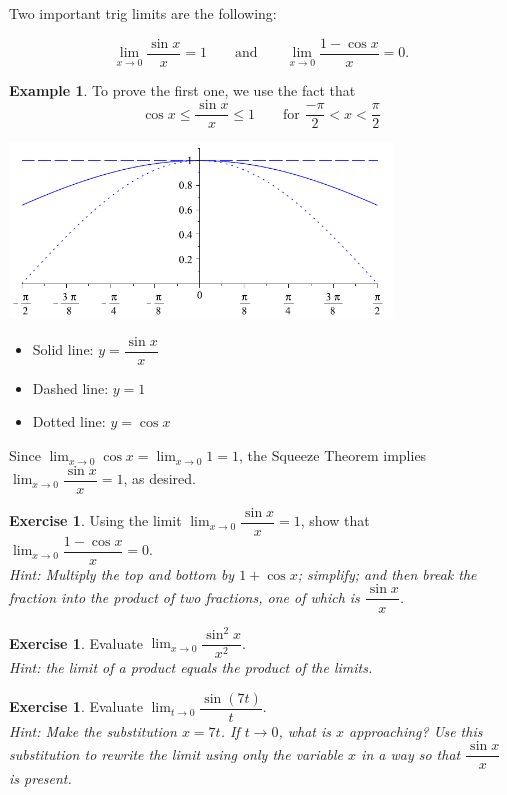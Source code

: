 \documentclass[11pt,reqno,final]{amsart}
\numberwithin{figure}{section}
\theoremstyle{definition} %
\newtheorem{example}[equation]{Example}%
\newtheorem{exercise}[question]{Exercise}
\newcommand{\dlim}{\displaystyle\lim}
\begin{document}
Two important trig limits are the following:
\begin{framed}
        \[
                \dlim_{x \to 0} \dfrac{\sin x}{x} = 1 \qquad \mbox{and} \qquad \dlim_{x \to 0} \dfrac{1 - \cos x}{x} = 0.
        \]
\end{framed}

\begin{example}
        To prove the first one, we use the fact that
        \[
                \cos x \leq \dfrac{\sin x}{x} \leq 1 \qquad \mbox{for $\frac{-\pi}{2} < x < \frac{\pi}{2}$}
        \]
        \begin{center}
                \includegraphics[width=4in]{10-02P_sinxx.png}
        \end{center}
        \begin{itemize}
        \item Solid line: $y = \dfrac{\sin x}{x}$
        \item Dashed line: $y = 1$
        \item Dotted line: $y = \cos x$
        \end{itemize}
        Since $\dlim_{x \to 0} \cos x = \dlim_{x \to 0} 1 = 1$, the Squeeze Theorem implies $\dlim_{x \to 0} \dfrac{\sin x}{x} = 1$, as desired.
\end{example}

\newpage

\begin{exercise}
        Using the limit $\dlim_{x \to 0} \dfrac{\sin x}{x} = 1$, show that $\dlim_{x \to 0} \dfrac{1 - \cos x}{x} = 0$.\\
        \textit{Hint: Multiply the top and bottom by $1 + \cos x$; simplify; and then break the fraction into the product of two fractions, one of which is $\dfrac{\sin x}{x}$.}
        \vfill        
\end{exercise}

\begin{exercise}
        Evaluate $\dlim_{x \to 0} \dfrac{\sin^2 x}{x^2}$.\\
        \textit{Hint: the limit of a product equals the product of the limits.}
        \vfill
\end{exercise}

\begin{exercise}
        Evaluate $\dlim_{t \to 0} \dfrac{\sin(7t)}{t}$.\\
        \textit{Hint: Make the substitution $x = 7t$. If $t \to 0$, what is $x$ approaching?
          Use this substitution to rewrite the limit using only the variable $x$ in a way so that $\dfrac{\sin x}{x}$ is present.}
        \vfill
\end{exercise}
\end{document}
